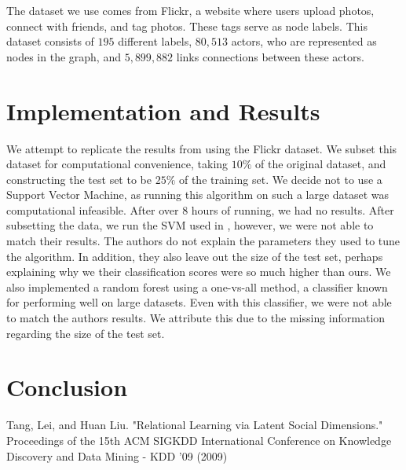 \documentclass[11pt,letterpaper]{article}
\begin{document}
The dataset we use comes from Flickr, a website where users upload photos, connect with friends, and tag photos. These tags serve as node labels. This dataset consists of $195$ different labels, $80,513$ actors, who are represented as nodes in the graph, and $5,899,882$ links connections between these actors. 

\section*{Implementation and Results}
We attempt to replicate the results from \cite{latent} using the Flickr dataset. We subset this dataset for computational convenience, taking $10\%$ of the original dataset, and constructing the test set to be $25\%$ of the training set. We decide not to use a Support Vector Machine, as running this algorithm on such a large dataset was computational infeasible. After over $8$ hours of running, we had no results. After subsetting the data, we run the SVM used in \cite{latent}, however, we were not able to match their results. The authors do not explain the parameters they used to tune the algorithm. In addition, they also leave out the size of the test set, perhaps explaining why we their classification scores were so much higher than ours. We also implemented a random forest using a one-vs-all method, a classifier known for performing well on large datasets. Even with this classifier, we were not able to match the authors results. We attribute this due to the missing information regarding the size of the test set.


\section*{Conclusion}


\begin{thebibliography}{99} 
	
Tang, Lei, and Huan Liu. "Relational Learning via Latent Social Dimensions." Proceedings of the 15th ACM SIGKDD International Conference on Knowledge Discovery and Data Mining - KDD '09 (2009)

	
\end{thebibliography}
\end{document}
